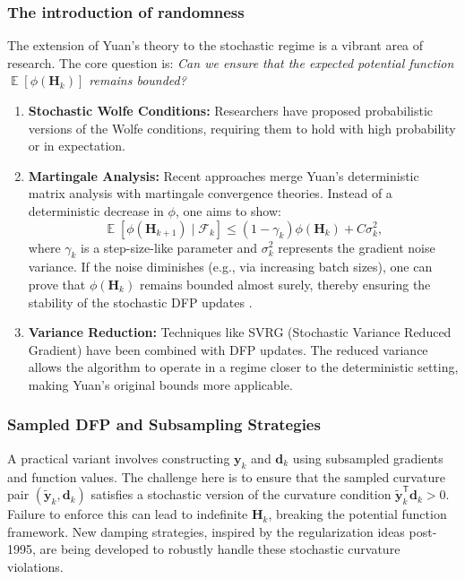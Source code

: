 \documentclass[12pt,a4paper]{article}  %
\newcounter{cite}
\theoremstyle{definition}
\numberwithin{equation}{section}
\newcommand{\HH}{\bm{H}}
\newcommand{\yy}{\bm{y}}
\newcommand{\trans}{{\scriptstyle{\mathsf{T}}}}
\newcommand{\dd}{\mathbf{d}}
\DeclareMathOperator{\expc}{\mathbb{E}}
\begin{document}
\subsubsection{The introduction of randomness}
The extension of Yuan's theory to the stochastic regime is a vibrant area of research. The core question is: \textit{Can we ensure that the expected potential function $\expc[\phi(\HH_k)]$ remains bounded?}
\begin{enumerate}
    \item \textbf{Stochastic Wolfe Conditions:} Researchers have proposed probabilistic versions of the Wolfe conditions, requiring them to hold with high probability or in expectation.
    \item \textbf{Martingale Analysis:} Recent approaches merge Yuan's deterministic matrix analysis with martingale convergence theories. Instead of a deterministic decrease in $\phi$, one aims to show:
    \begin{equation}
        \expc[\phi(\HH_{k+1}) \mid \mathcal{F}_k] \le (1 - \gamma_k) \phi(\HH_k) + C \sigma_k^2,
    \end{equation}
    where $\gamma_k$ is a step-size-like parameter and $\sigma_k^2$ represents the gradient noise variance. If the noise diminishes (e.g., via increasing batch sizes), one can prove that $\phi(\HH_k)$ remains bounded almost surely, thereby ensuring the stability of the stochastic DFP updates \cite{byrd2016, moritz2016}.
    \item \textbf{Variance Reduction:} Techniques like SVRG (Stochastic Variance Reduced Gradient) have been combined with DFP updates. The reduced variance allows the algorithm to operate in a regime closer to the deterministic setting, making Yuan's original bounds more applicable.
\end{enumerate}

\subsubsection{Sampled DFP and Subsampling Strategies}
A practical variant involves constructing $\yy_k$ and $\dd_k$ using subsampled gradients and function values. The challenge here is to ensure that the sampled curvature pair $(\tilde{\yy}_k, \dd_k)$ satisfies a stochastic version of the curvature condition $\tilde{\yy}_k^\trans \dd_k > 0$. Failure to enforce this can lead to indefinite $\HH_k$, breaking the potential function framework. New damping strategies, inspired by the regularization ideas post-1995, are being developed to robustly handle these stochastic curvature violations.
\end{document}
